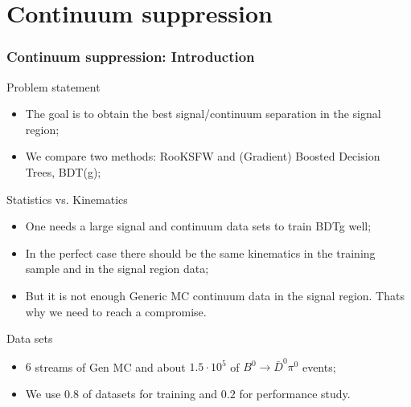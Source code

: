 \documentclass[10 pt,compress,mathserif]{beamer}
\newcommand{\bdpi}{\ensuremath{B^0\to \bar D^0\pi^0}\xspace}
\begin{document}
\section{Continuum suppression}
\frame{\tableofcontents[current]}
\begin{frame}[containsverbatim]
 \frametitle{Continuum suppression: Introduction}
 \begin{small}
  \begin{block}{Problem statement}
  \begin{itemize}
   \item The goal is to obtain the best signal/continuum separation in the signal region;
   \item We compare two methods: RooKSFW and (Gradient) Boosted Decision Trees, BDT(g);
   \end{itemize}
  \end{block}
  \begin{block}{Statistics vs. Kinematics}
  \begin{itemize}
   \item One needs a large signal and continuum data sets to train BDTg well;
   \item In the perfect case there should be the same kinematics in the training sample and in the signal region data;
   \item But it is not enough Generic MC continuum data in the signal region. Thats why we need to reach a compromise.
  \end{itemize}
  \end{block}
  \begin{block}{Data sets}
   \begin{itemize}
    \item $6$ streams of Gen MC and about $1.5\cdot 10^5$ of \bdpi events;
    \item We use $0.8$ of datasets for training and $0.2$ for performance study.
   \end{itemize}
  \end{block}
 \end{small}
\end{frame}
\end{document}
